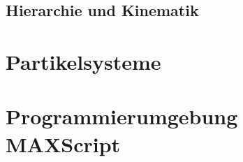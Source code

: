 \subsection{Hierarchie und Kinematik}

\section{Partikelsysteme}

\section{Programmierumgebung MAXScript}





